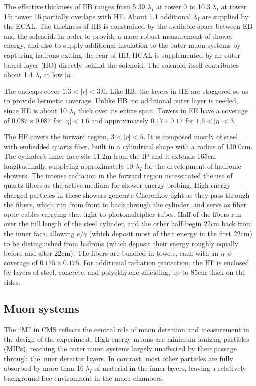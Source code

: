 \documentclass[oneside, letterpaper, 12pt, oldfontcommands]{memoir}
\begin{document}
The effective thickness of HB ranges from 5.39 $\lambda_{I}$ at tower 0 to 10.3 $\lambda_{I}$ at tower 15; tower 16 partially overlaps with HE.
About 1.1 additional $\lambda_{I}$ are supplied by the ECAL. The thickness of HB is constrained by the available space between EB
and the solenoid. In order to provide a more robust measurement of shower energy, and also to supply additional insulation to the outer muon systems
by capturing hadrons exiting the rear of HB, HCAL is supplemented by an outer barrel layer (HO) directly behind the solenoid.
The solenoid itself contributes about 1.4 $\lambda_{I}$ at low $|\eta|$.

The endcaps cover $1.3 < |\eta| < 3.0$. Like HB, the layers in HE are staggered so as to provide hermetic coverage. Unlike HB,
no additional outer layer is needed, since HE is about 10 $\lambda_{I}$ thick over its entire span. Towers in EE have a coverage
of $0.087{\times}0.087$ for $|\eta| < 1.6$ and approximately $0.17{\times}0.17$ for $1.6 < |\eta| < 3$.

The HF covers the forward region, $3 < |\eta| < 5$. It is composed mostly of steel with embedded quartz fiber, built in a cylindrical shape with a radius of 130.0\unit{cm}.
The cylinder's inner face sits 11.2\unit{m} from the IP and it extends 165\unit{cm} longitudinally, supplying approximately 10 $\lambda_{I}$ for
the development of hadronic showers. The intense radiation in the forward region necessitated the use of quartz fibers as the active medium for shower energy probing.
High-energy charged particles in these showers generate Cherenkov light as they pass through the fibers, which run from front to back through the cylinder,
and serve as fiber optic cables carrying that light to photomultiplier tubes. Half of the fibers run over the full length of the
steel cylinder, and the other half begin 22\unit{cm} back from the inner face, allowing $e/\gamma$ (which deposit most of their energy in the first 22\unit{cm}) to be
distinguished from hadrons (which deposit their energy roughly equally before and after 22\unit{cm}). The fibers are bundled in towers, each with an
$\eta$--$\phi$ coverage of $0.175{\times}0.175$. For additional radiation protection, the HF is enclosed by layers of steel, concrete, and polyethylene shielding,
up to 85\unit{cm} thick on the sides.

\subsection{Muon systems} \label{sec:LHCCMS_CMS_muon}
The ``M'' in CMS reflects the central role of muon detection and measurement in the design of the experiment.
High-energy muons are minimum-ionizing particles (MIPs), reaching the outer muon systems largely unaffected by their passage through
the inner detector layers. In contrast, most other particles are fully absorbed by more than 16 $\lambda_{I}$ of material in the inner
layers, leaving a relatively background-free environment in the muon chambers.
\end{document}

